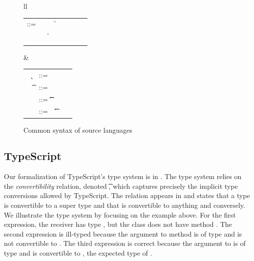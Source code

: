 \documentclass{tex/llncs}
\begin{document}
\begin{figure}[!h]\hrulefill
	\vspace{2mm}  \small
	
	\begin{tabular}{ll}
		\begin{minipage}{6cm}\begin{tabular}{@{}l@{~}l@{}l@{}l@{}l@{}l@{}l@{}l}
				\e\hspace{.1cm} ::= & \hspace{.2cm} \x        
				&\B \this         
				&\B \FRead\f \\    
				&
				&\B \FWrite\f\e
				&\B \Call\e\m\e \\
				& 
				&\B \that      
				&\B \New\C{\e[1]..}  
		\end{tabular}\end{minipage}&
		\begin{minipage}{5cm}\begin{tabular}{l@{~}l@{}l@{}l}
				~ \k &::= \Class \C {\fd[1]..}{\md[1]..} \\
				~ \t&::= ~ \any  \B   \C  \B \src{\CW}  \\ 
				\md &::= \Mdef\m\x\t\t\e \\
				~\fd&::= ~ \Fdef\f\t \\ 
		\end{tabular}\end{minipage} 
	\end{tabular}
	\vspace{2mm} 
	\caption{Common syntax of source languages}\label{f:sourcesyntax2}
\end{figure}

\subsection{TypeScript}


Our formalization of TypeScript's type system is in
. The type system relies on the \emph{convertibility}
relation, denoted \ConvertE{}\t\tp, which captures precisely the implicit
type conversions allowed by TypeScript.  The relation appears in
 and states that a type is convertible to a super type and
that \any is convertible to anything and conversely. We illustrate the type
system by focusing on the example above. For the first expression, the
receiver has type \C, but the class does not have method \n. The second
expression is ill-typed because the argument to method \m is of type \C and
\C is not convertible to \D. The third expression is correct because the
argument to \mp is of type \C and \C is convertible to \any, the expected
type of \mp.
\end{document}
